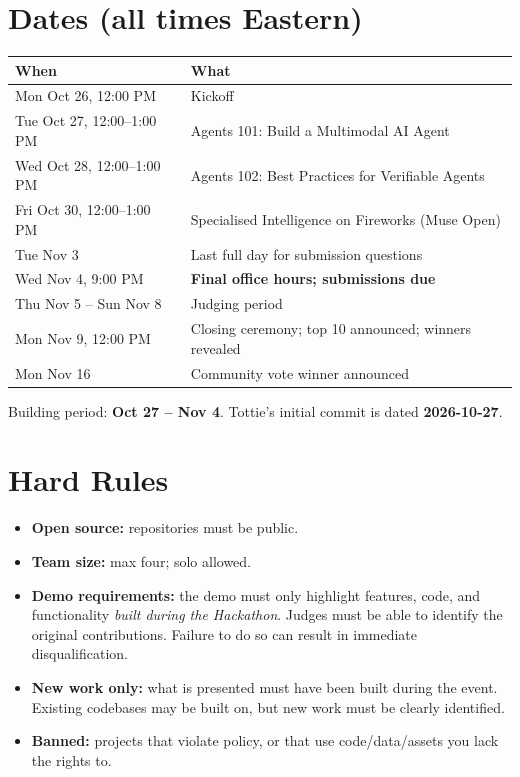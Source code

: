 \section{Dates (all times Eastern)}
\begin{longtable}{@{}ll@{}}
\toprule
When & What \\
\midrule
Mon Oct 26, 12:00 PM & Kickoff \\
Tue Oct 27, 12:00--1:00 PM & Agents 101: Build a Multimodal AI Agent \\
Wed Oct 28, 12:00--1:00 PM & Agents 102: Best Practices for Verifiable Agents \\
Fri Oct 30, 12:00--1:00 PM & Specialised Intelligence on Fireworks (Muse Open) \\
Tue Nov 3 & Last full day for submission questions \\
Wed Nov 4, 9:00 PM & \textbf{Final office hours; submissions due} \\
Thu Nov 5 -- Sun Nov 8 & Judging period \\
Mon Nov 9, 12:00 PM & Closing ceremony; top 10 announced; winners revealed \\
Mon Nov 16 & Community vote winner announced \\
\bottomrule
\end{longtable}
Building period: \textbf{Oct 27 -- Nov 4}. Tottie's initial commit is dated \textbf{2026-10-27}.

\section{Hard Rules}
\begin{itemize}
  \item \textbf{Open source:} repositories must be public.
  \item \textbf{Team size:} max four; solo allowed.
  \item \textbf{Demo requirements:} the demo must only highlight features, code, and functionality
  \emph{built during the Hackathon}. Judges must be able to identify the original contributions.
  Failure to do so can result in immediate disqualification.
  \item \textbf{New work only:} what is presented must have been built during the event. Existing
  codebases may be built on, but new work must be clearly identified.
  \item \textbf{Banned:} projects that violate policy, or that use code/data/assets you lack the
  rights to.
\end{itemize}

